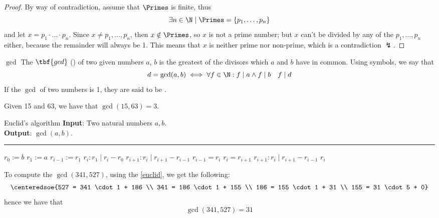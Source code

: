 \documentclass[a4paper, 12pt]{report}
\begin{document}
    \begin{proof}
        By way of contradiction, assume that $\Primes$ is finite, thus $$\exists n \in \N \mid \Primes = \{p_1, \ldots, p_n\}$$ and let $x = p_1 \cdot \ldots \cdot p_n$. Since $x \neq p_1, \ldots, p_n$, then $x \notin \Primes$, so $x$ is not a prime number; but $x$ can't be divided by any of the $p_1, \ldots, p_n$ either, because the remainder will always be 1. This means that $x$ is neither prime nor non-prime, which is a contradiction $\lightning$.
    \end{proof}

    \begin{frameddefn}[label={gcd}]{$\gcd$}
        The $\tbf{gcd}$ () of two given numbers $a$, $b$ is the greatest of the divisors which $a$ and $b$ have in common. Using symbols, we say that $$d = \gcd(a, b) \iff \forall f \in \N : f \mid a \land f \mid b \quad f \mid d$$ If the $\gcd$ of two numbers is 1, they are said to be .
    \end{frameddefn}

    \begin{example}[$\gcd$]
        Given 15 and 63, we have that $\gcd(15, 63) = 3$.
    \end{example}

    \begin{framedalgo}[label={euclid}]{Euclid's algorithm}
        \textbf{Input}: Two natural numbers $a, b$.\\
        \textbf{Output}: $\gcd(a, b)$.

        \hrule
        \begin{algorithmic}[1]
                \State $r_0 := b$
                \State $r_1 := a$
                \State $r_{i - 1} := r_1$
                \State $r_i : r_1 \mid r_i - r_0$
                \State $r_{i + 1} : r_i \mid r_{i + 1} - r_{i - 1}$
                    \State $r_{i - 1} = r_i$
                    \State $r_i = r_{i + 1}$
                    \State $r_{i + 1} : r_i \mid r_{i + 1} - r_{i - 1}$
                \EndWhile
                \State {} $r_i$
            \EndFunction
        \end{algorithmic}
    \end{framedalgo}


    \begin{example}
        \label{euclid example}
        To compute the $\gcd(341, 527)$, using the \cref{euclid}, we get the following: $$\centeredsoe{527 = 341 \cdot 1 + 186 \\ 341 = 186 \cdot 1 + 155 \\ 186 = 155 \cdot 1 + 31 \\ 155 = 31 \cdot 5 + 0}$$ hence we have that $$\gcd(341, 527) = 31$$
    \end{example}
\end{document}

